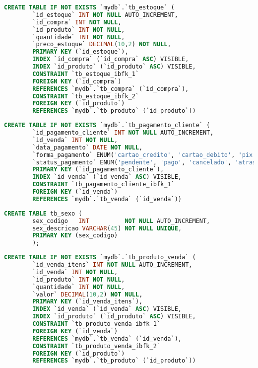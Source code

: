 \documentclass[
12pt,
a4paper,
semrecuonosumario,
sumario = abnt-6027-2012]{report}
\begin{document}
    \begin{lstlisting}[language=SQL,caption={DDL -- Tabela \texttt{tb\_estoque}}]
    	CREATE TABLE IF NOT EXISTS `mydb`.`tb_estoque` (
    	`id_estoque` INT NOT NULL AUTO_INCREMENT,
    	`id_compra` INT NOT NULL,
    	`id_produto` INT NOT NULL,
    	`quantidade` INT NOT NULL,
    	`preco_estoque` DECIMAL(10,2) NOT NULL,
    	PRIMARY KEY (`id_estoque`),
    	INDEX `id_compra` (`id_compra` ASC) VISIBLE,
    	INDEX `id_produto` (`id_produto` ASC) VISIBLE,
    	CONSTRAINT `tb_estoque_ibfk_1`
    	FOREIGN KEY (`id_compra`)
    	REFERENCES `mydb`.`tb_compra` (`id_compra`),
    	CONSTRAINT `tb_estoque_ibfk_2`
    	FOREIGN KEY (`id_produto`)
    	REFERENCES `mydb`.`tb_produto` (`id_produto`))
    \end{lstlisting}
    \begin{lstlisting}[language=SQL,caption={DDL -- Tabela \texttt{tb\_pagamento\_cliente}}]
    	CREATE TABLE IF NOT EXISTS `mydb`.`tb_pagamento_cliente` (
    	`id_pagamento_cliente` INT NOT NULL AUTO_INCREMENT,
    	`id_venda` INT NOT NULL,
    	`data_pagamento` DATE NOT NULL,
    	`forma_pagamento` ENUM('cartao_credito', 'cartao_debito', 'pix', 'boleto', 'dinheiro') NOT NULL,
    	`status_pagamento` ENUM('pendente', 'pago', 'cancelado', 'atrasado') NOT NULL,
    	PRIMARY KEY (`id_pagamento_cliente`),
    	INDEX `id_venda` (`id_venda` ASC) VISIBLE,
    	CONSTRAINT `tb_pagamento_cliente_ibfk_1`
    	FOREIGN KEY (`id_venda`)
    	REFERENCES `mydb`.`tb_venda` (`id_venda`))
    \end{lstlisting}
    \begin{lstlisting}[language=SQL,caption={DDL -- Tabela \texttt{tb\_sexo}}]
    	CREATE TABLE tb_sexo (
    	sex_codigo   INT          NOT NULL AUTO_INCREMENT,
    	sex_descricao VARCHAR(45) NOT NULL UNIQUE,
    	PRIMARY KEY (sex_codigo)
    	);
    \end{lstlisting}
    \begin{lstlisting}[language=SQL,caption={DDL -- Tabela \texttt{tb\_produto\_venda}}]
    	CREATE TABLE IF NOT EXISTS `mydb`.`tb_produto_venda` (
    	`id_venda_itens` INT NOT NULL AUTO_INCREMENT,
    	`id_venda` INT NOT NULL,
    	`id_produto` INT NOT NULL,
    	`quantidade` INT NOT NULL,
    	`valor` DECIMAL(10,2) NOT NULL,
    	PRIMARY KEY (`id_venda_itens`),
    	INDEX `id_venda` (`id_venda` ASC) VISIBLE,
    	INDEX `id_produto` (`id_produto` ASC) VISIBLE,
    	CONSTRAINT `tb_produto_venda_ibfk_1`
    	FOREIGN KEY (`id_venda`)
    	REFERENCES `mydb`.`tb_venda` (`id_venda`),
    	CONSTRAINT `tb_produto_venda_ibfk_2`
    	FOREIGN KEY (`id_produto`)
    	REFERENCES `mydb`.`tb_produto` (`id_produto`))
    \end{lstlisting}
\end{document}
